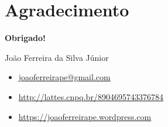 \documentclass[
  11pt,
  aspectratio=169,
  english,                    %
  french,                     %
  spanish,                    %
  brazil                      %
  ]{beamer}
\makeatletter
\def\professor{João Ferreira da Silva Júnior}
\def\professoremail{joaoferreirape@gmail.com}
\def\professorsite{https://joaoferreirape.wordpress.com}
\def\professorlattes{http://lattes.cnpq.br/8904695743376784}
\makeatother
\begin{document}
\section[Agradecimento]{Agradecimento}\label{sec:agradecimentos}



{
  \begin{frame}[plain,t]

    \vfill
    \vspace*{0.15\paperheight}

    \begin{center}
      \Huge{\textbf{Obrigado!}}
    \end{center}

    \vspace*{0.15\paperheight}
    \vfill

    \begin{block}{\professor}
      \justifying{}
      \begin{itemize}
        \justifying{}
        \setlength\itemsep{1em}
        \item \href{mailto:\professoremail}{\professoremail}
        \item \href{\professorlattes}{\professorlattes}
        \item \href{professorsite}{\professorsite}
      \end{itemize}
    \end{block}

  \end{frame}
} %



\end{document}
